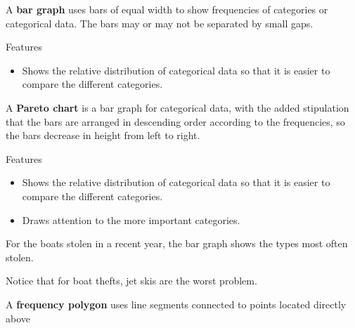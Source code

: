 \documentclass{beamer}
\begin{document}
\begin{frame}
\begin{definition}
A \textbf{bar graph} uses bars of equal width to show frequencies of categories or categorical data. The bars may or may not be separated by small gaps.
\end{definition}\pause

\begin{block}{Features}
\begin{itemize}
\item Shows the relative distribution of categorical data so that it is easier to compare the different categories.
\end{itemize}
\end{block}\pause

\begin{definition}
A \textbf{Pareto chart} is a bar graph for categorical data, with the added stipulation that the bars are arranged in descending order according to the frequencies, so the bars decrease in height from left to right.
\end{definition}\pause

\begin{block}{Features}
\begin{itemize}
\item Shows the relative distribution of categorical data so that it is easier to compare the different categories.
\item Draws attention to the more important categories.
\end{itemize}
\end{block}
\end{frame}

\begin{frame}
\begin{example}
For the boats stolen in a recent year, the bar graph shows the types most often stolen.

\begin{center}

\end{center}\pause

Notice that for boat thefts, jet skis are the worst problem.
\end{example}
\end{frame}

\begin{frame}
\begin{definition}
A \textbf{frequency polygon} uses line segments connected to points located directly above 
\end{definition}
\end{frame}
\end{document}
